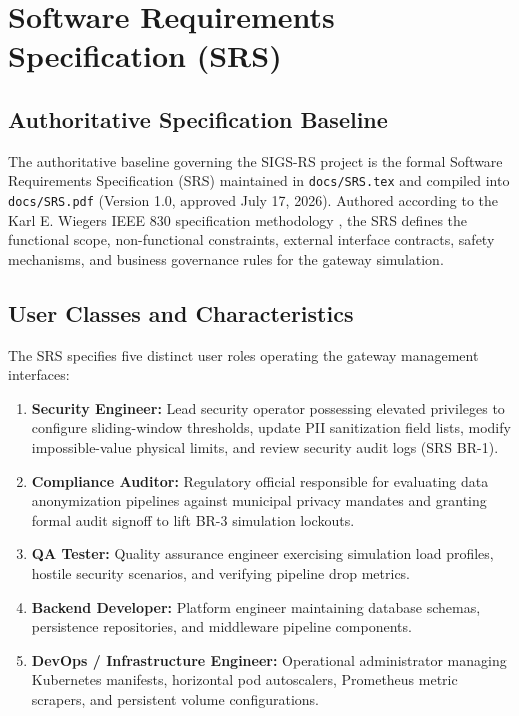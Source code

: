 \section{Software Requirements Specification (SRS)}

\subsection{Authoritative Specification Baseline}
The authoritative baseline governing the SIGS-RS project is the formal Software Requirements Specification (SRS) maintained in \texttt{docs/SRS.tex} and compiled into \texttt{docs/SRS.pdf} (Version 1.0, approved July 17, 2026). Authored according to the Karl E. Wiegers IEEE 830 specification methodology \cite{wiegers_srs}, the SRS defines the functional scope, non-functional constraints, external interface contracts, safety mechanisms, and business governance rules for the gateway simulation.

\subsection{User Classes and Characteristics}
The SRS specifies five distinct user roles operating the gateway management interfaces:
\begin{enumerate}[label=\textbf{\arabic*.}]
    \item \textbf{Security Engineer:} Lead security operator possessing elevated privileges to configure sliding-window thresholds, update PII sanitization field lists, modify impossible-value physical limits, and review security audit logs (SRS BR-1).
    \item \textbf{Compliance Auditor:} Regulatory official responsible for evaluating data anonymization pipelines against municipal privacy mandates and granting formal audit signoff to lift BR-3 simulation lockouts.
    \item \textbf{QA Tester:} Quality assurance engineer exercising simulation load profiles, hostile security scenarios, and verifying pipeline drop metrics.
    \item \textbf{Backend Developer:} Platform engineer maintaining database schemas, persistence repositories, and middleware pipeline components.
    \item \textbf{DevOps / Infrastructure Engineer:} Operational administrator managing Kubernetes manifests, horizontal pod autoscalers, Prometheus metric scrapers, and persistent volume configurations.
\end{enumerate}

